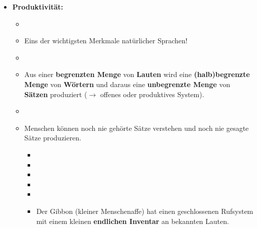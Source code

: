 
\begin{frame}

\begin{itemize}
	\item<1-> \textbf{Produktivität:}
	
	\begin{itemize}
		\item[]				
		\item<1-> Eins der wichtigsten Merkmale natürlicher Sprachen!
		\item[]
		\item<2-> Aus einer \textbf{begrenzten Menge} von \textbf{Lauten} wird eine \textbf{(halb)begrenzte Menge} von \textbf{Wörtern} und daraus eine \textbf{unbegrenzte Menge} von \textbf{Sätzen} produziert ($\rightarrow$ offenes oder produktives System).
		\item[]
		\item<2-> Menschen können noch nie gehörte Sätze verstehen und noch nie gesagte Sätze produzieren.
	
		\begin{itemize}
			\item[]
			\item<3->[$\rightarrow$] 
			\item[]
			\item<3->[$\rightarrow$]  
			\item[]
			\item<4->[$\rightarrow$] Der Gibbon (kleiner Menschenaffe) hat einen geschlossenen Rufsystem mit einem kleinen \textbf{endlichen Inventar} an bekannten Lauten. 
		\end{itemize}
	
	\end{itemize}

\end{itemize}

\end{frame}



